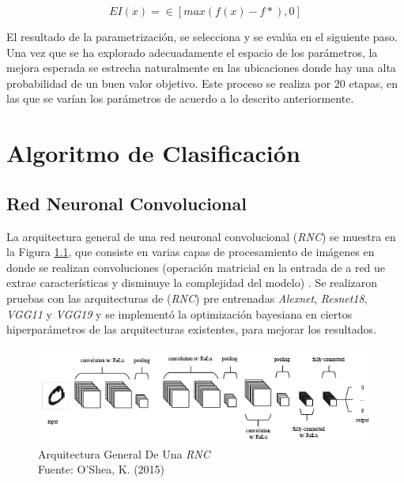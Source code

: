 \begin{equation}
	{EI(x)=\in[max(f(x)-f*),0]}
	\label{EI}
\end{equation}

El resultado de la parametrización, se selecciona y se evalúa en el siguiente paso. Una vez que se ha explorado adecuadamente el espacio de los parámetros, la mejora esperada se estrecha naturalmente en las ubicaciones donde hay una alta probabilidad de un buen valor objetivo. Este proceso se realiza por $20$ etapas, en las que se varían los parámetros de acuerdo a lo descrito anteriormente. 


\chapter{Algoritmo de Clasificación}

\section{Red Neuronal Convolucional}

La arquitectura general de una red neuronal convolucional (\textit{RNC}) se muestra en la Figura \ref{fig:cnnarchitecture}, que consiste en varias capas de procesamiento de imágenes en donde se realizan convoluciones (operación matricial en la entrada de a red ue extrae características y disminuye la complejidad del modelo) \cite{o2015introduction}. Se realizaron pruebas con las arquitecturas de (\textit{RNC}) pre entrenadas \textit{Alexnet}, \textit{Resnet18}, \textit{VGG11} y \textit{VGG19} y se implementó la optimización bayesiana en ciertos hiperparámetros de las arquitecturas existentes, para mejorar los resultados.

\vspace{1cm}

\begin{figure}[ht]
	\centering
	\includegraphics[scale=0.8]{Figs/A-generic-CNN-Architecture.png}	
	\caption{Arquitectura General De Una \textit{RNC} \\ Fuente: O'Shea, K. (2015)} 
	\label{fig:cnnarchitecture}
\end{figure}	


